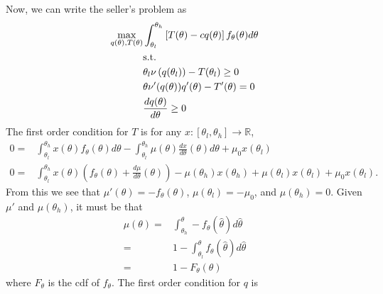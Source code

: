 \documentclass[12pt,reqno]{amsart}
\theoremstyle{definition}
\def\R{\mathbb{R}}
\renewcommand{\to}{{\rightarrow}}
\begin{document}
Now, we can write the seller's problem as
\begin{align}
  \max_{q(\theta),T(\theta)} & \int_{\theta_l}^{\theta_h} 
  \left[T(\theta) - cq(\theta)\right]
  f_\theta(\theta) d\theta \notag \\
  & \text{s.t.} \notag \\
  &\theta_l \nu\left(q(\theta_l)\right) - T(\theta_l) \geq 0
  \label{pcl} \\
  & \theta \nu'(q(\theta))q'(\theta) - T'(\theta) =  0 \label{lic2} \\
  & \frac{dq(\theta)}{d\theta} \geq  0 \label{mon2}
\end{align}
The first order condition for $T$ is for any $x:[\theta_l,\theta_h] \to \R$, 
\begin{align*}
  0 = &\int_{\theta_l}^{\theta_h} x(\theta) f_\theta(\theta)
  d\theta - \int_{\theta_l}^{\theta_h} \mu(\theta)
  \frac{dx}{d\theta}(\theta) d\theta + \mu_0 x(\theta_l)  \\
  0 = & \int_{\theta_l}^{\theta_h} x(\theta)\left( f_\theta(\theta) +
    \frac{d\mu}{d \theta}(\theta)\right) - \mu(\theta_h)x(\theta_h) +
  \mu(\theta_l)x(\theta_l) + \mu_0 x(\theta_l).
\end{align*}
From this we see that $\mu'(\theta) = -f_\theta(\theta)$,
$\mu(\theta_l) = -\mu_0$, and $\mu(\theta_h) = 0$. Given $\mu'$ and
$\mu(\theta_h)$, it must be that
\begin{align*}
  \mu(\theta) = & \int_{\theta_h}^\theta -f_\theta(\hat{\theta}) d\hat{\theta} \\
  = & 1 - \int_{\theta_l}^\theta f_{\theta}(\hat{\theta})d\hat{\theta}
  \\
  = & 1 - F_\theta(\theta) 
\end{align*}
where $F_\theta$ is the cdf of $f_\theta$. 
The first order condition for $q$ is
\end{document}
